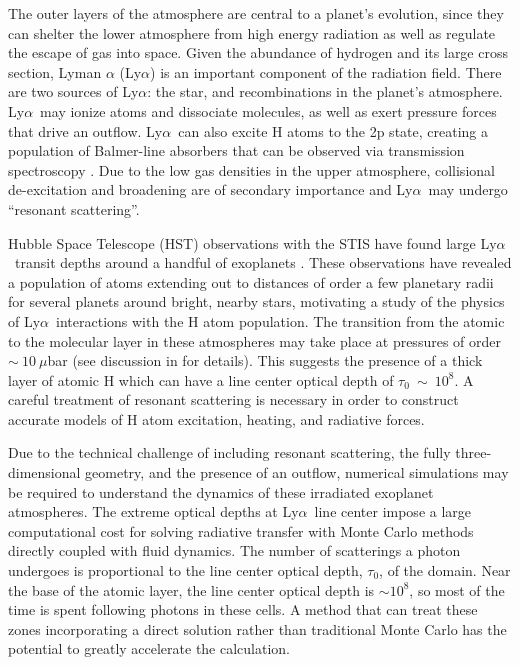 \documentclass{aastex63}
\newcommand\lya{Ly$\alpha$\ }
\begin{document}
The outer layers of the atmosphere are central to a planet's evolution, since they can shelter the lower atmosphere from high energy radiation as well as regulate the escape of gas into space. Given the abundance of hydrogen and its large cross section, Lyman $\alpha$ (Ly$\alpha$) is an important component of the radiation field. There are two sources of Ly$\alpha$: the star, and recombinations in the planet's atmosphere. \lya may ionize atoms and dissociate molecules, as well as exert pressure forces that drive an outflow. \lya can also excite H atoms to the 2p state, creating a population of Balmer-line absorbers that can be observed via transmission spectroscopy \citep{2017ApJ...851..150H}. Due to the low gas densities in the upper atmosphere, collisional de-excitation and broadening are of secondary importance and \lya may undergo ``resonant scattering''.

Hubble Space Telescope (HST) observations with the STIS have found large \lya transit depths around a handful of exoplanets \citep{2003Natur.422..143V, 2012A&A...543L...4L, 2012A&A...547A..18E, 2015Natur.522..459E,  2017A&A...597A..26B, 2017A&A...599L...3B, 2017A&A...602A.106B, 2018A&A...620A.147B, 2019AJ....158...50W, 2019EPSC...13.1928L, 2020ApJ...888L..21G,2021arXiv210309864B}. These observations have revealed a population of atoms extending out to distances of order a few planetary radii for several planets around bright, nearby stars, motivating a study of the physics of \lya interactions with the H atom population. The transition from the atomic to the molecular layer in these atmospheres may take place at pressures of order ${\sim}\ 10\ \mu$bar (see discussion in \citet{2017ApJ...851..150H} for details). This suggests the presence of a thick layer of atomic H which can have a line center optical depth of $\tau_0\ {\sim}\ 10^8$. A careful treatment of resonant scattering is necessary in order to construct accurate models of H atom excitation, heating, and radiative forces. 

Due to the technical challenge of including resonant scattering, the fully three-dimensional geometry, and the presence of an outflow, numerical simulations may be required to understand the dynamics of these irradiated exoplanet atmospheres. The extreme optical depths at \lya line center impose a large computational cost for solving radiative transfer with Monte Carlo methods directly coupled with fluid dynamics. The number of scatterings a photon undergoes is proportional to the line center optical depth, $\tau_0$, of the domain.  Near the base of the atomic layer, the line center optical depth is ${\sim}10^8$, so most of the time is spent following photons in these cells. A method that can treat these zones incorporating a direct solution rather than traditional Monte Carlo has the potential to greatly accelerate the calculation.
\end{document}
